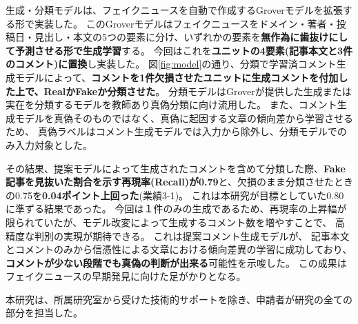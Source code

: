 {	生成・分類モデルは、フェイクニュースを自動で作成するGroverモデル\cite{NIPS2019_9106}を拡張する形で実装した。
	このGroverモデルはフェイクニュースをドメイン・著者・投稿日・見出し・本文の5つの要素に分け、いずれかの要素を\textbf{無作為に歯抜けにして予測させる形で生成学習}する。
	今回はこれを\textbf{ユニットの4要素(記事本文と3件のコメント)に置換}し実装した。
	図\ref{fig:model}の通り、分類で学習済コメント生成モデルによって、\textbf{コメントを1件欠損させたユニットに生成コメントを付加した上で、RealかFakeか分類させた}。
	分類モデルはGroverが提供した生成または実在を分類するモデルを教師あり真偽分類に向け流用した。
	また、コメント生成モデルを真偽そのものではなく、真偽に起因する文章の傾向差から学習させるため、
	真偽ラベルはコメント生成モデルでは入力から除外し、分類モデルでのみ入力対象とした。

	その結果、提案モデルによって生成されたコメントを含めて分類した際、\textbf{Fake記事を見抜いた割合を示す再現率(Recall)が0.79}と、欠損のまま分類させたときの0.75を\textbf{0.04ポイント上回った}(業績3-1)。
	これは本研究が目標としていた0.80に準ずる結果であった。
	今回は１件のみの⽣成であるため、再現率の上昇幅が限られていたが、モデル改変によって⽣成するコメント数を増やすことで、
	⾼精度な判別の実現が期待できる。
	これは提案コメント生成モデルが、
	記事本文とコメントのみから信憑性による文章における傾向差異の学習に成功しており、
	\textbf{コメントが少ない段階でも真偽の判断が出来る}可能性を示唆した。
	この成果はフェイクニュースの早期発⾒に向けた足がかりとなる。

	本研究は、所属研究室から受けた技術的サポートを除き、申請者が研究の全ての部分を担当した。

}
